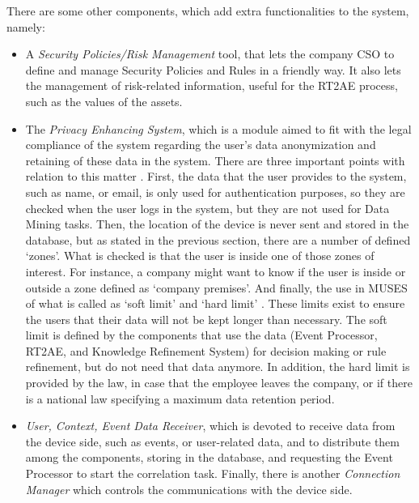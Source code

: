 There are some other components, which add extra functionalities to the system, namely:

\begin{itemize}
  \item A \textit{Security Policies/Risk Management} tool, that lets the company CSO to define and manage Security Policies and Rules in a friendly way. It also lets the management of risk-related information, useful for the RT2AE process, such as the values of the assets.
  \item  The \textit{Privacy Enhancing System}, which is a module aimed to fit with the legal compliance of the system regarding the user's data anonymization and retaining of these data in the system. There are three important points with relation to this matter \cite{deliverable72}. First, the data that the user provides to the system, such as name, or email, is only used for authentication purposes, so they are checked when the user logs in the system, but they are not used for Data Mining tasks. Then, the location of the device is never sent and stored in the database, but as stated in the previous section, there are a number of defined `zones'. What is checked is that the user is inside one of those zones of interest. For instance, a company might want to know if the user is inside or outside a zone defined as `company premises'. And finally, the use in MUSES of what is called as `soft limit' and `hard limit' \cite{deliverable72}. These limits exist to ensure the users that their data will not be kept longer than necessary. The soft limit is defined by the components that use the data (Event Processor, RT2AE, and Knowledge Refinement System) for decision making or rule refinement, but do not need that data anymore. In addition, the hard limit is provided by the law, in case that the employee leaves the company, or if there is a national law specifying a maximum data retention period.
  \item \textit{User, Context, Event Data Receiver}, which is devoted to receive data from the device side, such as events, or user-related data, and to distribute them among the components, storing in the database, and requesting the Event Processor to start the correlation task. Finally, there is another \textit{Connection Manager} which controls the communications with the device side. %
\end{itemize}


